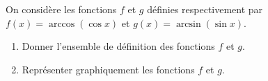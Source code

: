 
\begin{exercice}\label{exoautoanalyseCTU-9}


On considère les fonctions $f$ et  $g$ définies respectivement par $f(x) = \arccos(\cos x)$ et $g(x)= \arcsin(\sin x)$. 
\begin{enumerate}
\item Donner l'ensemble de définition des fonctions $f$ et $g$.
\item Représenter graphiquement les fonctions $f$ et $g$.
\end{enumerate}







\end{exercice}
